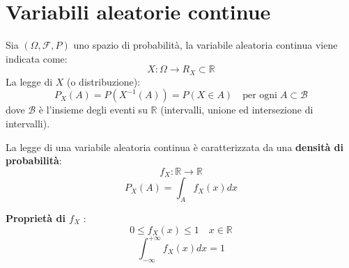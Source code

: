 \documentclass[a4paper]{article}
\theoremstyle{break}
\theoremstyle{break}
\theoremstyle{break}
\theoremstyle{break}
\begin{document}
\section{Variabili aleatorie continue}
Sia \( (\Omega, \mathcal{F}, P) \) uno spazio di probabilità, la variabile aleatoria
continua viene indicata come:
\[
X: \Omega \to R_X \subset \mathbb{R}
\] 
La legge di \( X \) (o distribuzione):
\[
  P_X(A) = P(X^{-1}(A)) = P(X \in A) \quad \text{per ogni} \; A \subset \mathcal{B}
\] 
dove \( \mathcal{B} \) è l'insieme degli eventi su \( \mathbb{R} \) (intervalli, unione
ed intersezione di intervalli).

\vspace{1em}
\noindent La legge di una variabile aleatoria continua è caratterizzata da una
\textbf{densità di probabilità}:
\[
f_X: \mathbb{R} \to \mathbb{R}
\] 
\[
P_X(A) = \int_A f_X(x)dx
\] 

\textbf{Proprietà di \( f_X \) }:
\[
0 \le f_X(x) \le 1 \quad x \in \mathbb{R}
\] 
\[
\int_{-\infty}^{+\infty} f_X(x)dx = 1
\] 
\end{document}
